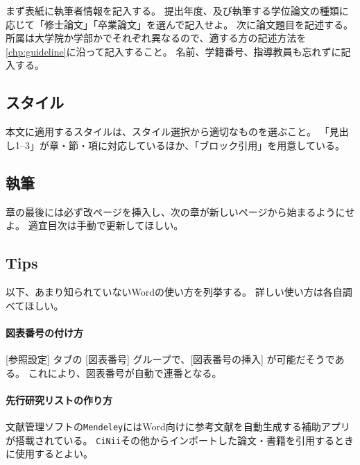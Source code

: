 			まず表紙に執筆者情報を記入する。
			提出年度、及び執筆する学位論文の種類に応じて「修士論文」「卒業論文」を選んで記入せよ。
			次に論文題目を記述する。
			所属は大学院か学部かでそれぞれ異なるので、適する方の記述方法を\cref{chp:guideline}に沿って記入すること。
			名前、学籍番号、指導教員も忘れずに記入する。

		\subsection{スタイル}
		  \label{sub:style_w}

			本文に適用するスタイルは、スタイル選択から適切なものを選ぶこと。
			「見出し1--3」が章・節・項に対応しているほか、「ブロック引用」を用意している。

		\subsection{執筆}
		  \label{sub:writing_w}

			章の最後には必ず改ページを挿入し、次の章が新しいページから始まるようにせよ。
			適宜目次は手動で更新してほしい。


		\subsection{Tips}
			\label{tips}

			以下、あまり知られていないWordの使い方を列挙する。
			詳しい使い方は各自調べてほしい。

		  \paragraph{図表番号の付け方}

				[参照設定] タブの [図表番号] グループで、[図表番号の挿入] が可能だそうである。
				これにより、図表番号が自動で連番となる。

			\paragraph{先行研究リストの作り方}

				文献管理ソフトの\texttt{Mendeley}にはWord向けに参考文献を自動生成する補助アプリが搭載されている。
				\texttt{CiNii}その他からインポートした論文・書籍を引用するときに使用するとよい。
